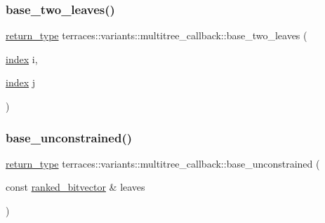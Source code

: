 \subsubsection{\texorpdfstring{base\+\_\+two\+\_\+leaves()}{base\_two\_leaves()}}
{\footnotesize\ttfamily \hyperlink{classterraces_1_1variants_1_1multitree__callback_a31341dbe798daa06859cd3e0ab354bf1}{return\+\_\+type} terraces\+::variants\+::multitree\+\_\+callback\+::base\+\_\+two\+\_\+leaves (\begin{DoxyParamCaption}\item[{\hyperlink{namespaceterraces_adbc33ccb543d1634e96d0eb02e472c77}{index}}]{i,  }\item[{\hyperlink{namespaceterraces_adbc33ccb543d1634e96d0eb02e472c77}{index}}]{j }\end{DoxyParamCaption})\hspace{0.3cm}{\ttfamily [inline]}}

\mbox{\label{classterraces_1_1variants_1_1multitree__callback_a4cc94019b17d106020ddc5530f85a93f}} 
\subsubsection{\texorpdfstring{base\+\_\+unconstrained()}{base\_unconstrained()}}
{\footnotesize\ttfamily \hyperlink{classterraces_1_1variants_1_1multitree__callback_a31341dbe798daa06859cd3e0ab354bf1}{return\+\_\+type} terraces\+::variants\+::multitree\+\_\+callback\+::base\+\_\+unconstrained (\begin{DoxyParamCaption}\item[{const \hyperlink{namespaceterraces_acc45ec9c561024c50ecbce5b6738ba08}{ranked\+\_\+bitvector} \&}]{leaves }\end{DoxyParamCaption})\hspace{0.3cm}{\ttfamily [inline]}}

\mbox{\label{classterraces_1_1variants_1_1multitree__callback_a8376df6caa4ecafab1003f84e5d19c5d}} 
